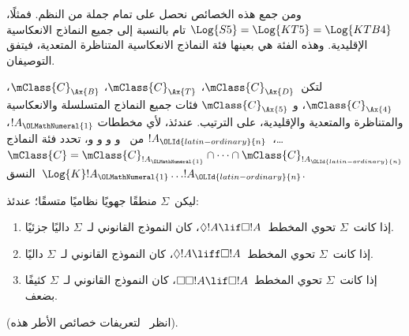 \documentclass[../../../include/open-logic-section]{subfiles}
\begin{document}
ومن جمع هذه الخصائص نحصل على تمام جملة من النظم.
فمثلًا، $ \Log{S5} = \Log{KT5} = \Log{KTB4}$
تام بالنسبة إلى جميع النماذج الانعكاسية الإقليدية.
وهذه الفئة هي بعينها فئة النماذج الانعكاسية المتناظرة المتعدية،
فيتفق التوصيفان.

\begin{thm}
  لتكن~$\mClass{C}_\Ax{D}$، $\mClass{C}_\Ax{T}$،
  $\mClass{C}_\Ax{B}$، $\mClass{C}_\Ax{4}$، و
  $\mClass{C}_\Ax{5}$ فئات جميع النماذج المتسلسلة والانعكاسية
  والمتناظرة والمتعدية والإقليدية، على الترتيب. عندئذ، لأي مخططات
  $!A_\OLMathNumeral{1}$، \dots،~$!A_\OLId{latin-ordinary}{n}$ من~ و و و و،
  تحدد فئة النماذج
  $\mClass{C} = \mClass{C}_{!A_\OLMathNumeral{1}} \cap \dots
  \cap \mClass{C}_{!A_\OLId{latin-ordinary}{n}}$ النسق~$\Log{K}!A_\OLMathNumeral{1} \dots !A_\OLId{latin-ordinary}{n}$.
\end{thm}

\begin{prop}
  ليكن~$\Sigma$ منطقًا جهويًا نظاميًا متسقًا؛ عندئذ:
  \begin{enumerate}
  \item{}%
    إذا كانت~$\Sigma$ تحوي المخطط~$\Diamond!A \lif \Box !A$، كان
    النموذج القانوني لـ~$\Sigma$ داليًا جزئيًا.
  \item إذا كانت~$\Sigma$ تحوي المخطط~$\Diamond!A \liff \Box !A$،
    كان النموذج القانوني لـ~$\Sigma$ داليًا.
  \item إذا كانت~$\Sigma$ تحوي المخطط~$\Box\Box!A \lif \Box !A$،
    كان النموذج القانوني لـ~$\Sigma$ كثيفًا بضعف.
  \end{enumerate}
(انظر~ لتعريفات خصائص الأطر هذه).
\end{prop}
\end{document}
